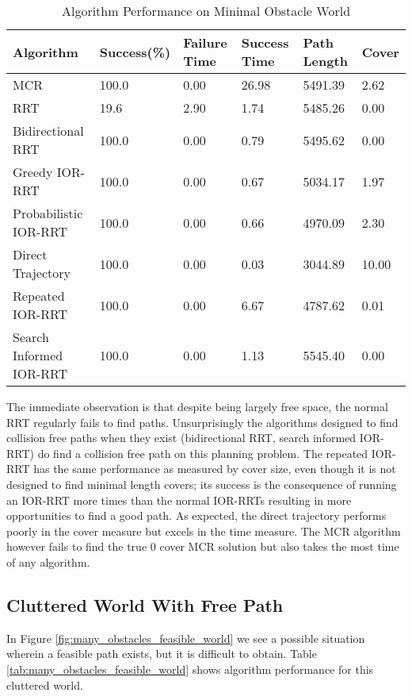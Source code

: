 \begin{table}[h!]
\centering
\begin{tabular}{@{}llllll@{}}
\toprule
Algorithm & Success(\%) & Failure Time & Success Time & Path Length & Cover \\
\midrule
MCR & 100.0 & 0.00 & 26.98 & 5491.39 & 2.62 \\
RRT & 19.6 & 2.90 & 1.74 & 5485.26 & 0.00 \\
Bidirectional RRT & 100.0 & 0.00 & 0.79 & 5495.62 & 0.00 \\
Greedy IOR-RRT & 100.0 & 0.00 & 0.67 & 5034.17 & 1.97 \\
Probabilistic IOR-RRT & 100.0 & 0.00 & 0.66 & 4970.09 & 2.30 \\
Direct Trajectory & 100.0 & 0.00 & 0.03 & 3044.89 & 10.00 \\
Repeated IOR-RRT & 100.0 & 0.00 & 6.67 & 4787.62 & 0.01 \\
Search Informed IOR-RRT & 100.0 & 0.00 & 1.13 & 5545.40 & 0.00 \\
\bottomrule
\end{tabular}
\caption{Algorithm Performance on Minimal Obstacle World}
\label{tab:feasible_world}
\end{table}

The immediate observation is that despite being largely free space, the normal RRT regularly fails to find paths. Unsurprisingly the algorithms designed to find collision free paths when they exist (bidirectional RRT, search informed IOR-RRT) do find a collision free path on this planning problem. The repeated IOR-RRT has the same performance as measured by cover size, even though it is not designed to find minimal length covers; its success is the consequence of running an IOR-RRT more times than the normal IOR-RRTs resulting in more opportunities to find a good path. As expected, the direct trajectory performs poorly in the cover measure but excels in the time measure. The MCR algorithm however fails to find the true 0 cover MCR solution but also takes the most time of any algorithm.

\subsection{Cluttered World With Free Path}
In Figure \ref{fig:many_obstacles_feasible_world} we see a possible situation wherein a feasible path exists, but it is difficult to obtain. Table \ref{tab:many_obstacles_feasible_world} shows algorithm performance for this cluttered world.

